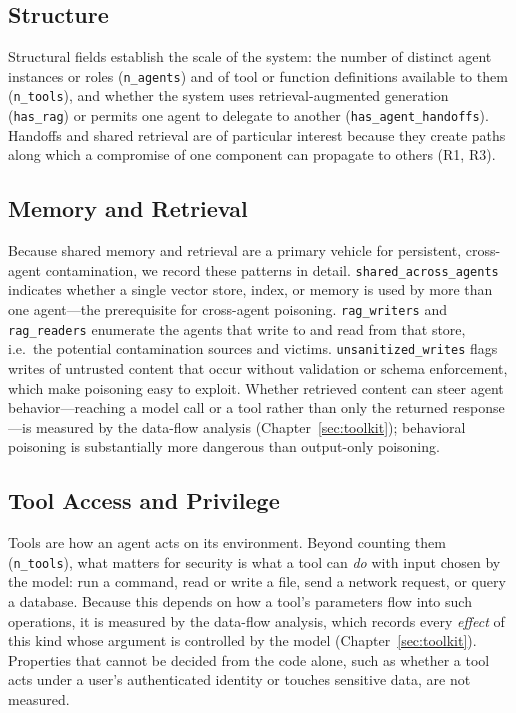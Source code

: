 \subsection{Structure}

Structural fields establish the scale of the system: the number of distinct agent instances or roles (\texttt{n\_agents}) and of tool or function definitions available to them (\texttt{n\_tools}), and whether the system uses retrieval-augmented generation (\texttt{has\_rag}) or permits one agent to delegate to another (\texttt{has\_agent\_handoffs}). Handoffs and shared retrieval are of particular interest because they create paths along which a compromise of one component can propagate to others (R1, R3).
 

\subsection{Memory and Retrieval}

Because shared memory and retrieval are a primary vehicle for persistent, cross-agent contamination, we record these patterns in detail. \texttt{shared\_across\_agents} indicates whether a single vector store, index, or memory is used by more than one agent---the prerequisite for cross-agent poisoning. \texttt{rag\_writers} and \texttt{rag\_readers} enumerate the agents that write to and read from that store, i.e.\ the potential contamination sources and victims. \texttt{unsanitized\_writes} flags writes of untrusted content that occur without validation or schema enforcement, which make poisoning easy to exploit. Whether retrieved content can steer agent behavior---reaching a model call or a tool rather than only the returned response---is measured by the data-flow analysis (Chapter~\ref{sec:toolkit}); behavioral poisoning is substantially more dangerous than output-only poisoning.
 

\subsection{Tool Access and Privilege}

Tools are how an agent acts on its environment. Beyond counting them (\texttt{n\_tools}), what matters for security is what a tool can \emph{do} with input chosen by the model: run a command, read or write a file, send a network request, or query a database. Because this depends on how a tool's parameters flow into such operations, it is measured by the data-flow analysis, which records every \emph{effect} of this kind whose argument is controlled by the model (Chapter~\ref{sec:toolkit}). Properties that cannot be decided from the code alone, such as whether a tool acts under a user's authenticated identity or touches sensitive data, are not measured.
 

